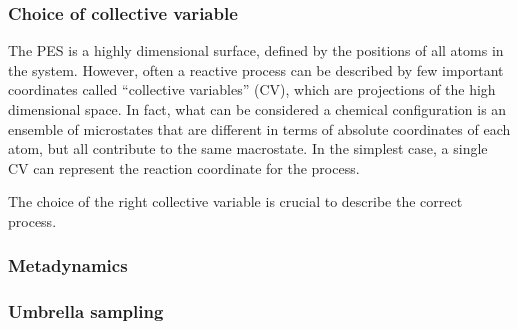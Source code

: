 \subsubsection*{Choice of collective variable}
The PES is a highly dimensional surface, defined by the positions of all atoms in the system. However, often a reactive process can be described by few important coordinates called ``collective variables'' (CV), which are projections of the high dimensional space. In fact, what can be considered a chemical configuration is an ensemble of microstates that are different in terms of absolute coordinates of each atom, but all contribute to the same macrostate.
In the simplest case, a single CV can represent the reaction coordinate for the process.

The choice of the right collective variable is crucial to describe the correct process. 


\subsubsection*{Metadynamics}



\subsubsection*{Umbrella sampling}



\clearpage{\pagestyle{empty}\cleardoublepage}



